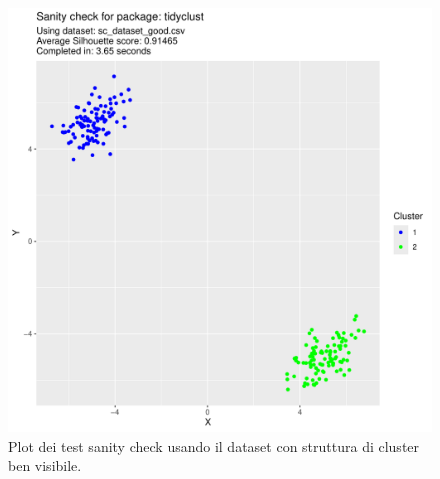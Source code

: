 \documentclass[italian]{article}
\begin{document}
\begin{figure}[h]
\begin{boxedminipage}{0.5\textwidth}
				\end{boxedminipage}
				\begin{boxedminipage}{0.5\textwidth}
					\includegraphics[width = \textwidth, page = 1]{results/results_TIDYCLUST.pdf}
				\end{boxedminipage}
				\begin{boxedminipage}{0.5\textwidth}
				\end{boxedminipage}
				\caption{Plot dei test sanity check usando il dataset con struttura di cluster
				ben visibile.}
				\label{fig:good}
			\end{figure}
\end{document}
